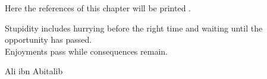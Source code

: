 \clearpage

Here the references of this chapter will be printed \cite{Jahanshahi13:JJAP}.
\printreferences

\par\vspace*{\fill}
\epigraph{\epifont\SingleSpacing
Stupidity includes hurrying before the right time and waiting until the 
opportunity has passed.\\[1em]
Enjoyments pass while consequences remain.
}{Ali ibn Abitalib}\newpage